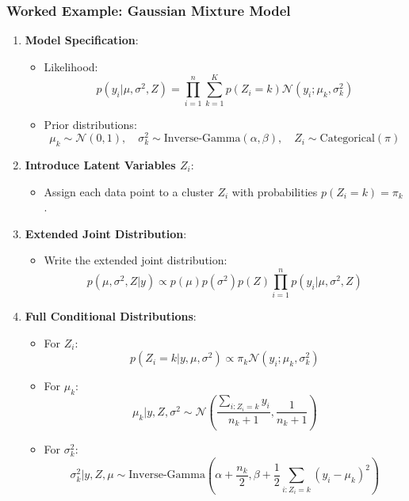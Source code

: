 \documentclass{article}
\begin{document}
\subsubsection*{Worked Example: Gaussian Mixture Model}
\begin{enumerate}
    \item \textbf{Model Specification}:
    \begin{itemize}
        \item Likelihood:
        \[
        p(y_i | \mu, \sigma^2, Z) = \prod_{i=1}^n \sum_{k=1}^K p(Z_i = k) \mathcal{N}(y_i; \mu_k, \sigma_k^2)
        \]
        \item Prior distributions:
        \[
        \mu_k \sim \mathcal{N}(0, 1), \quad \sigma_k^2 \sim \text{Inverse-Gamma}(\alpha, \beta), \quad Z_i \sim \text{Categorical}(\pi)
        \]
    \end{itemize}
    
    \item \textbf{Introduce Latent Variables \(Z_i\)}:
    \begin{itemize}
        \item Assign each data point to a cluster \(Z_i\) with probabilities \(p(Z_i = k) = \pi_k\).
    \end{itemize}
    
    \item \textbf{Extended Joint Distribution}:
    \begin{itemize}
        \item Write the extended joint distribution:
        \[
        p(\mu, \sigma^2, Z | y) \propto p(\mu) p(\sigma^2) p(Z) \prod_{i=1}^n p(y_i | \mu, \sigma^2, Z)
        \]
    \end{itemize}
    
    \item \textbf{Full Conditional Distributions}:
    \begin{itemize}
        \item For \(Z_i\):
        \[
        p(Z_i = k | y, \mu, \sigma^2) \propto \pi_k \mathcal{N}(y_i; \mu_k, \sigma_k^2)
        \]
        \item For \(\mu_k\):
        \[
        \mu_k | y, Z, \sigma^2 \sim \mathcal{N}\left( \frac{\sum_{i:Z_i=k} y_i}{n_k + 1}, \frac{1}{n_k + 1} \right)
        \]
        \item For \(\sigma_k^2\):
        \[
        \sigma_k^2 | y, Z, \mu \sim \text{Inverse-Gamma}\left( \alpha + \frac{n_k}{2}, \beta + \frac{1}{2}\sum_{i:Z_i=k} (y_i - \mu_k)^2 \right)
        \]
    \end{itemize}
    

\end{enumerate}
\end{document}
